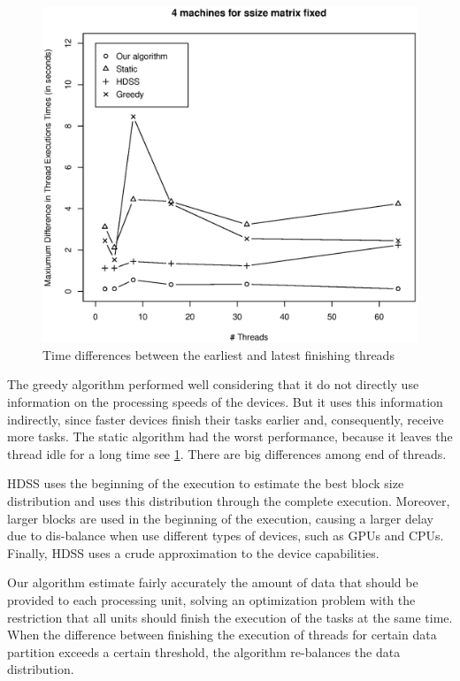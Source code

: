 \documentclass[journal]{IEEEtran}
\begin{document}
\begin{figure}[htb]
	\begin{center}
	\centering
			\includegraphics[scale=0.4]{Maxima_Diferenca_Matrix.eps}
	\caption{Time differences between the earliest and latest finishing threads}
	\label{fig:diferencaThreads}
	\end{center}
\end{figure}


The greedy algorithm performed well considering that it do not directly
use information on the processing speeds of the devices. But it uses this
information indirectly, since faster devices finish their tasks earlier and,
consequently, receive more tasks. The static algorithm had the worst performance, because it leaves the thread idle for a long time see \ref{fig:diferencaThreads}. There are big differences among end of threads.

HDSS uses the beginning of the execution to estimate the best block size
distribution and uses this distribution through the complete
execution. Moreover, larger blocks are used in the beginning of the execution,
causing a larger delay due to dis-balance when use different types of devices,
such as GPUs and CPUs. Finally, HDSS uses a crude approximation to the device
capabilities.

Our algorithm estimate fairly accurately the amount of data that should be
provided to each processing unit, solving an optimization problem with the
restriction that all units should finish the execution of the tasks at the same
time. When the difference between finishing the execution of threads for certain
data partition exceeds a certain threshold, the algorithm re-balances the data
distribution.
\end{document}
